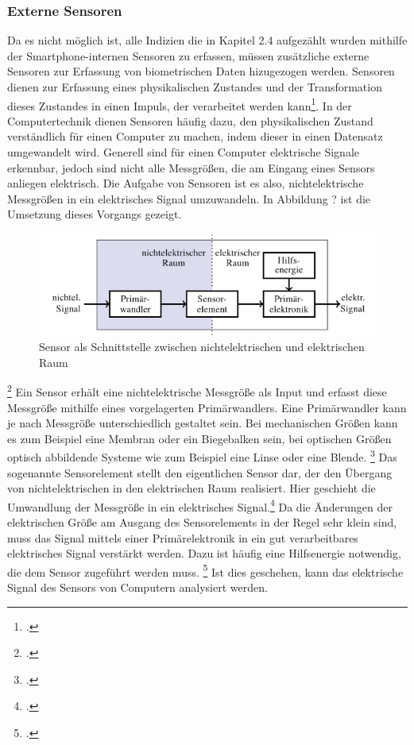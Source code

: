 \subsubsection{Externe Sensoren}
Da es nicht möglich ist, alle Indizien die in Kapitel 2.4 aufgezählt wurden mithilfe der Smartphone-internen Sensoren zu erfassen, müssen zusätzliche externe Sensoren zur Erfassung von biometrischen Daten hizugezogen werden. \newline
Sensoren dienen zur Erfassung eines physikalischen Zustandes und der Transformation dieses Zustandes in einen Impuls, der verarbeitet werden kann\footcite[Vgl.][]{Web18}. In der Computertechnik dienen Sensoren häufig dazu, den physikalischen Zustand verständlich für einen Computer zu machen, indem dieser in einen Datensatz umgewandelt wird. Generell sind für einen Computer elektrische Signale erkennbar, jedoch sind nicht alle Messgrößen, die am Eingang eines Sensors anliegen elektrisch. Die Aufgabe von Sensoren ist es also, nichtelektrische Messgrößen in ein elektrisches Signal umzuwandeln. \newline
In Abbildung ? ist die Umsetzung dieses Vorgangs gezeigt.
\begin{figure}[h]
	\centering
	\includegraphics[width=16cm]{Bilder/sensor.png}
	\caption[Sensor als Schnittstelle zwischen nicht-elektrischen und elektrischen Raum]{Sensor als Schnittstelle zwischen nichtelektrischen und elektrischen Raum\footnotemark}
\end{figure}\footcitetext[][S. 347]{Ros13} \newline
Ein Sensor erhält eine nichtelektrische Messgröße als Input und erfasst diese Messgröße mithilfe eines vorgelagerten Primärwandlers. Eine Primärwandler kann je nach Messgröße unterschiedlich gestaltet sein. Bei mechanischen Größen kann es zum Beispiel eine Membran oder ein Biegebalken sein, bei optischen Größen optisch abbildende Systeme wie zum Beispiel eine Linse oder eine Blende. \footcite[Vgl. ][S. 347]{Ros13} \newline Das sogenannte Sensorelement stellt den eigentlichen Sensor dar, der den Übergang von nichtelektrischen in den elektrischen Raum realisiert. Hier geschieht die Umwandlung der Messgröße in ein elektrisches Signal.\footcite[Vgl. ][S. 347]{Ros13} \newline Da die Änderungen der elektrischen Größe am Ausgang des Sensorelements in der Regel sehr klein sind, muss das Signal mittels einer Primärelektronik in ein gut verarbeitbares elektrisches Signal verstärkt werden. Dazu ist häufig eine Hilfsenergie notwendig, die dem Sensor zugeführt werden muss. \footcite[Vgl. ][S. 347]{Ros13} Ist dies geschehen, kann das elektrische Signal des Sensors von Computern analysiert werden.\newline
